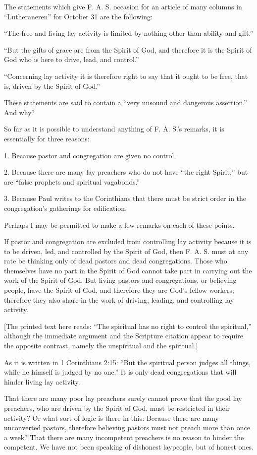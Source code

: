 The statements which give F. A. S. occasion for an article of many columns in “Lutheraneren” for October 31 are the following:

“The free and living lay activity is limited by nothing other than ability and gift.”

“But the gifts of grace are from the Spirit of God, and therefore it is the Spirit of God who is here to drive, lead, and control.”

“Concerning lay activity it is therefore right to say that it ought to be free, that is, driven by the Spirit of God.”

These statements are said to contain a “very unsound and dangerous assertion.” And why?

So far as it is possible to understand anything of F. A. S.’s remarks, it is essentially for three reasons:

1. Because pastor and congregation are given no control.

2. Because there are many lay preachers who do not have “the right Spirit,” but are “false prophets and spiritual vagabonds.”

3. Because Paul writes to the Corinthians that there must be strict order in the congregation’s gatherings for edification.

Perhaps I may be permitted to make a few remarks on each of these points.

If pastor and congregation are excluded from controlling lay activity because it is to be driven, led, and controlled by the Spirit of God, then F. A. S. must at any rate be thinking only of dead pastors and dead congregations. Those who themselves have no part in the Spirit of God cannot take part in carrying out the work of the Spirit of God. But living pastors and congregations, or believing people, have the Spirit of God, and therefore they are God’s fellow workers; therefore they also share in the work of driving, leading, and controlling lay activity.

[The printed text here reads: “The spiritual has no right to control the spiritual,” although the immediate argument and the Scripture citation appear to require the opposite contrast, namely the unspiritual and the spiritual.]

As it is written in 1 Corinthians 2:15: “But the spiritual person judges all things, while he himself is judged by no one.” It is only dead congregations that will hinder living lay activity.

That there are many poor lay preachers surely cannot prove that the good lay preachers, who are driven by the Spirit of God, must be restricted in their activity? Or what sort of logic is there in this: Because there are many unconverted pastors, therefore believing pastors must not preach more than once a week? That there are many incompetent preachers is no reason to hinder the competent. We have not been speaking of dishonest laypeople, but of honest ones.

